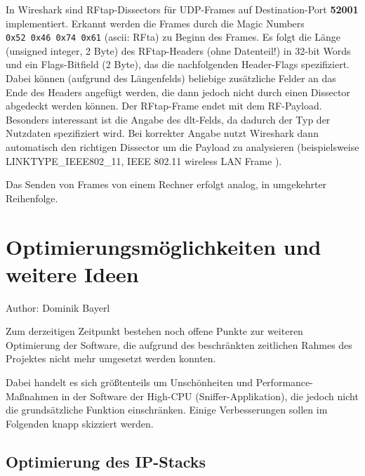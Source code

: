 \documentclass[letterpaper,11pt,ngerman]{article}
\begin{document}
\begin{onehalfspace}
In Wireshark sind RFtap-Dissectors für UDP-Frames auf Destination-Port
\textbf{52001} implementiert. Erkannt werden die Frames durch die Magic
Numbers \texttt{0x52\ 0x46\ 0x74\ 0x61} (ascii: RFta) zu Beginn des
Frames. Es folgt die Länge (unsigned integer, 2 Byte) des RFtap-Headers
(ohne Datenteil!) in 32-bit Words und ein Flags-Bitfield (2 Byte), das
die nachfolgenden Header-Flags
spezifiziert\autocite{rftap-specifications}. Dabei können (aufgrund des
Längenfelds) beliebige zusätzliche Felder an das Ende des Headers
angefügt werden, die dann jedoch nicht durch einen Dissector abgedeckt
werden können. Der RFtap-Frame endet mit dem RF-Payload. Besonders
interessant ist die Angabe des \ac{dlt}-Felds, da dadurch der Typ der
Nutzdaten spezifiziert wird. Bei korrekter Angabe nutzt Wireshark dann
automatisch den richtigen Dissector um die Payload zu analysieren
(beispielsweise LINKTYPE\_IEEE802\_11, IEEE 802.11 wireless LAN Frame
\autocite{tcpdump}).

Das Senden von Frames von einem Rechner erfolgt analog, in umgekehrter
Reihenfolge.


\section{Optimierungsmöglichkeiten und weitere
Ideen}\label{optimierungsmuxf6glichkeiten-und-weitere-ideen}
\small Author: Dominik Bayerl\\
\Large

Zum derzeitigen Zeitpunkt bestehen noch offene Punkte zur weiteren
Optimierung der Software, die aufgrund des beschränkten zeitlichen
Rahmes des Projektes nicht mehr umgesetzt werden konnten.

Dabei handelt es sich größtenteils um Unschönheiten und
Performance-Maßnahmen in der Software der High-CPU
(Sniffer-Applikation), die jedoch nicht die grundsätzliche Funktion
einschränken. Einige Verbesserungen sollen im Folgenden knapp skizziert
werden.

\subsection{Optimierung des IP-Stacks}
\label{optimierung-des-ip-stacks}


\end{onehalfspace}
\end{document}

